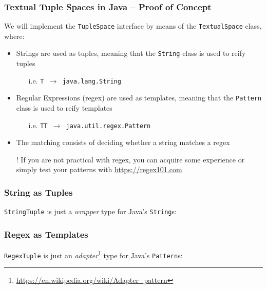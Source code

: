 \documentclass[presentation]{beamer}\mode<presentation>{\usetheme{AMSCesenaPurpleAndGold}}
\begin{document}
\begin{frame}%
\frametitle{Textual Tuple Spaces in Java -- Proof of Concept}

	We will implement the \texttt{TupleSpace} interface by means of the \texttt{\alert{Textual}Space} class, where:
	\vfill
	\begin{itemize}
		\item Strings are used as tuples, meaning that the \texttt{\alert{String}} class is used to reify tuples
	\begin{itemize}
		\item[i.e.] \texttt{T $\rightarrow$ java.lang.\alert{String}}
	\end{itemize}

	\vfill

	\item Regular Expressions (regex) are used as templates, meaning that the \texttt{\alert{Pattern}} class is used to reify templates
	\begin{itemize}
		\item[i.e.] \texttt{TT $\rightarrow$ java.util.regex.\alert{Pattern}}
		\end{itemize}

		\vfill

		\item The matching consists of \alert{deciding} whether a string matches a regex

		\vfill

		\item[!] If you are not practical with regex, you can acquire some experience or simply test your patterns with \url{https://regex101.com}
	\end{itemize}

\end{frame}

\begin{frame}
\frametitle{String as Tuples}

	\texttt{StringTuple} is just a \emph{wrapper} type for Java's \texttt{String}s:
	

\end{frame}

\begin{frame}
\frametitle{Regex as Templates}

	\texttt{RegexTuple} is just an \emph{adapter}\footnote{\url{https://en.wikipedia.org/wiki/Adapter_pattern}} type for Java's \texttt{Pattern}s:
	

\end{frame}
\end{document}
